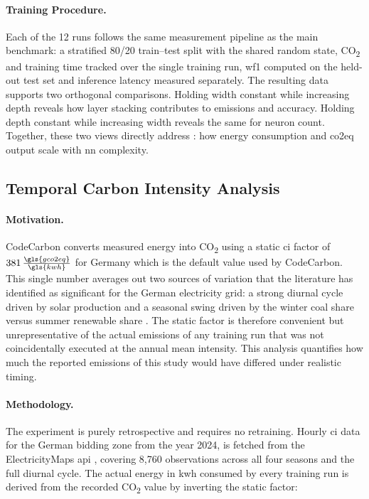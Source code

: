 \paragraph{Training Procedure.}
Each of the 12 runs follows the same measurement pipeline as the main benchmark: a stratified 80/20 train--test split with the shared random state, CO\textsubscript{2} and training time tracked over the single training run, \gls{wf1} computed on the held-out test set and inference latency measured separately. The resulting data supports two orthogonal comparisons. Holding width constant while increasing depth reveals how layer stacking contributes to emissions and accuracy. Holding depth constant while increasing width reveals the same for neuron count. Together, these two views directly address : how energy consumption and \gls{co2eq} output scale with \gls{nn} complexity.

\subsection{Temporal Carbon Intensity Analysis}
\label{design_carbon_intensity}\label{exp:4}

\paragraph{Motivation.}
CodeCarbon converts measured energy into CO\textsubscript{2} using a static \gls{ci} factor of $381\,\frac{\gls{gco2eq}}{\gls{kwh}}$ for Germany which is the default value used by CodeCarbon. This single number averages out two sources of variation that the literature has identified as significant for the German electricity grid: a strong diurnal cycle driven by solar production and a seasonal swing driven by the winter coal share versus summer renewable share \cite{dodgeMeasuringCarbonIntensity2022}. The static factor is therefore convenient but unrepresentative of the actual emissions of any training run that was not coincidentally executed at the annual mean intensity. This analysis quantifies how much the reported emissions of this study would have differed under realistic timing.

\paragraph{Methodology.}
The experiment is purely retrospective and requires no retraining. Hourly \gls{ci} data for the German bidding zone from the year 2024, is fetched from the ElectricityMaps \gls{api} \cite{electricityMapsAPI2025}, covering 8{,}760 observations across all four seasons and the full diurnal cycle. The actual energy in \gls{kwh} consumed by every training run is derived from the recorded CO\textsubscript{2} value by inverting the static factor:

